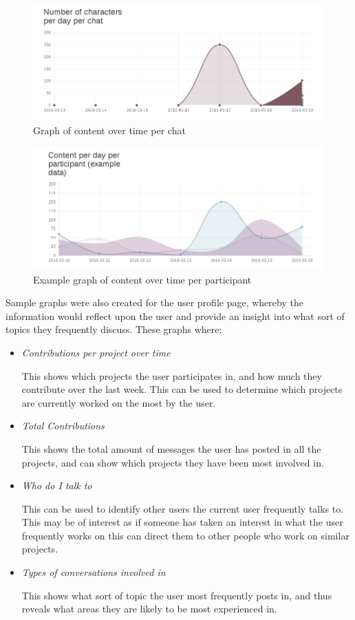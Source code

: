 \documentclass{l4proj}
\begin{document}
\begin{figure}[h]
\includegraphics[scale=0.75]{WorkingGraph.png}
\centering
\caption{Graph of content over time per chat}
\label{fig:3}
\end{figure}


\begin{figure}[h]
\includegraphics[scale=0.75]{SampleGraph.png}
\centering
\caption{Example graph of content over time per participant}
\label{fig:4}

\end{figure}

\newpage
Sample graphs were also created for the user profile page, whereby the information would reflect upon the user and provide an insight into what sort of topics they frequently discuss. These graphs where:

\begin{itemize}
\item \textit{Contributions per project over time} 
\par This shows which projects the user participates in, and how much they contribute over the last week.  This can be used to determine which projects are currently worked on the most by the user.
\item \textit{Total Contributions}
\par This shows the total amount of messages the user has posted in all the projects, and can show which projects they have been most involved in.
\item \textit{Who do I talk to}
\par This can be used to identify other users the current user frequently talks to.  This may be of interest as if someone has taken an interest in what the user frequently works on this can direct them to other people who work on similar projects.
\item \textit{Types of conversations involved in}
\par This shows what sort of topic the user most frequently posts in, and thus reveals what areas they are likely to be most experienced in. 
\end{itemize}
\end{document}

